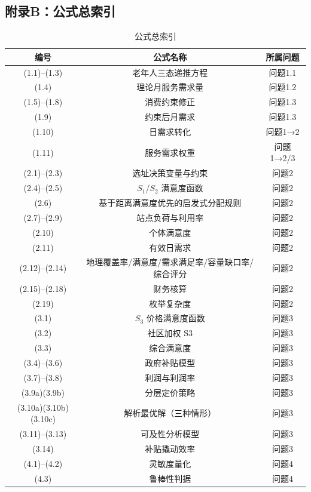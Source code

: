 \documentclass[UTF8]{ctexart}
\begin{document}
\subsection{附录B：公式总索引}

\begin{table}[H]
\centering
\caption{公式总索引}
\renewcommand{\arraystretch}{1.3}
\begin{tabular}{|c|c|c|}
\hline
\textbf{编号} & \textbf{公式名称} & \textbf{所属问题} \\
\hline
(1.1)–(1.3) & 老年人三态递推方程 & 问题1.1 \\
\hline
(1.4) & 理论月服务需求量 & 问题1.2 \\
\hline
(1.5)–(1.8) & 消费约束修正 & 问题1.3 \\
\hline
(1.9) & 约束后月需求 & 问题1.3 \\
\hline
(1.10) & 日需求转化 & 问题1→2 \\
\hline
(1.11) & 服务需求权重 & 问题1→2/3 \\
\hline
(2.1)–(2.3) & 选址决策变量与约束 & 问题2 \\
\hline
(2.4)–(2.5) & $S_1$/$S_2$ 满意度函数 & 问题2 \\
\hline
(2.6) & 基于距离满意度优先的启发式分配规则 & 问题2 \\
\hline
(2.7)–(2.9) & 站点负荷与利用率 & 问题2 \\
\hline
(2.10) & 个体满意度 & 问题2 \\
\hline
(2.11) & 有效日需求 & 问题2 \\
\hline
(2.12)–(2.14) & 地理覆盖率/满意度/需求满足率/容量缺口率/综合评分 & 问题2 \\
\hline
(2.15)–(2.18) & 财务核算 & 问题2 \\
\hline
(2.19) & 枚举复杂度 & 问题2 \\
\hline
(3.1) & $S_3$ 价格满意度函数 & 问题3 \\
\hline
(3.2) & 社区加权 S3 & 问题3 \\
\hline
(3.3) & 综合满意度 & 问题3 \\
\hline
(3.4)–(3.6) & 政府补贴模型 & 问题3 \\
\hline
(3.7)–(3.8) & 利润与利润率 & 问题3 \\
\hline
(3.9a)(3.9b) & 分层定价策略 & 问题3 \\
\hline
(3.10a)(3.10b)(3.10c) & 解析最优解（三种情形） & 问题3 \\
\hline
(3.11)–(3.13) & 可及性分析模型 & 问题3 \\
\hline
(3.14) & 补贴撬动效率 & 问题3 \\
\hline
(4.1)–(4.2) & 灵敏度量化 & 问题4 \\
\hline
(4.3) & 鲁棒性判据 & 问题4 \\
\hline
\end{tabular}
\end{table}
\end{document}
